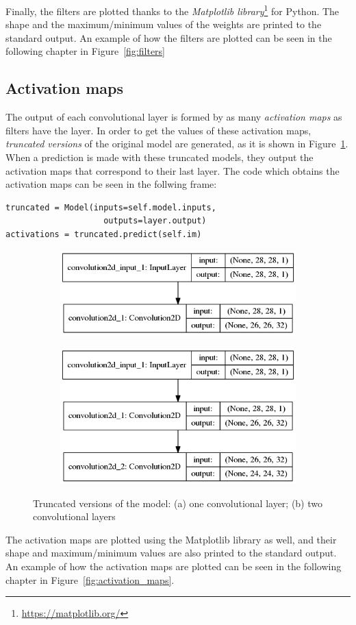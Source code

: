 Finally, the filters are plotted thanks to the \emph{Matplotlib library}\footnote{\url{https://matplotlib.org/}} for Python. The shape and the maximum/minimum values of the weights are printed to the standard output. An example of how the filters are plotted can be seen in the following chapter in Figure~\ref{fig:filters}

\subsection{Activation maps}
The output of each convolutional layer is formed by as many \emph{activation maps} as filters have the layer. In order to get the values of these activation maps, \emph{truncated versions} of the original model are generated, as it is shown in Figure~\ref{fig:truncated}. When a prediction is made with these truncated models, they output the activation maps that correspond to their last layer. The code which obtains the activation maps can be seen in the follwing frame:
\begin{lstlisting}
truncated = Model(inputs=self.model.inputs,
                    outputs=layer.output)
activations = truncated.predict(self.im)
\end{lstlisting}

\begin{figure}
	\begin{subfigure}{0.5\textwidth}
		\centering
		\includegraphics[width=0.9\linewidth]{figures/1stconvarch.png}
		\caption{}
	\end{subfigure}
	\begin{subfigure}{0.5\textwidth}
		\centering
		\includegraphics[width=0.9\linewidth]{figures/2ndconvarch.png}
		\caption{}
	\end{subfigure}
	\caption{Truncated versions of the model: (a) one convolutional layer; (b) two convolutional layers}
	\label{fig:truncated}
\end{figure}

The activation maps are plotted using the Matplotlib library as well, and their shape and maximum/minimum values are also printed to the standard output. An example of how the activation maps are plotted can be seen in the following chapter in Figure~\ref{fig:activation_maps}.
